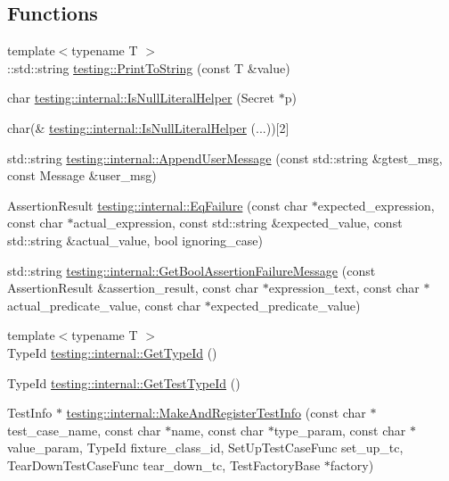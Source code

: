 \subsection*{Functions}
\begin{DoxyCompactItemize}
\item 
{\footnotesize template$<$typename T $>$ }\\\-::std\-::string \hyperlink{namespacetesting_aa5717bb1144edd1d262d310ba70c82ed}{testing\-::\-Print\-To\-String} (const T \&value)
\item 
char \hyperlink{namespacetesting_1_1internal_afb0731ba39ffef1fa1730ac0699c9025}{testing\-::internal\-::\-Is\-Null\-Literal\-Helper} (Secret $\ast$p)
\item 
char(\& \hyperlink{namespacetesting_1_1internal_ab53ecfa1632a871ce7c692d722a75a57}{testing\-::internal\-::\-Is\-Null\-Literal\-Helper} (...))\mbox{[}2\mbox{]}
\item 
std\-::string \hyperlink{namespacetesting_1_1internal_ae475a090bca903bb222dd389eb189166}{testing\-::internal\-::\-Append\-User\-Message} (const std\-::string \&gtest\-\_\-msg, const Message \&user\-\_\-msg)
\item 
Assertion\-Result \hyperlink{namespacetesting_1_1internal_a08725846ff184d3e79bcf5be4df19157}{testing\-::internal\-::\-Eq\-Failure} (const char $\ast$expected\-\_\-expression, const char $\ast$actual\-\_\-expression, const std\-::string \&expected\-\_\-value, const std\-::string \&actual\-\_\-value, bool ignoring\-\_\-case)
\item 
std\-::string \hyperlink{namespacetesting_1_1internal_a5fd6e5dc9eb20ab3c3a80e24d89dfac6}{testing\-::internal\-::\-Get\-Bool\-Assertion\-Failure\-Message} (const Assertion\-Result \&assertion\-\_\-result, const char $\ast$expression\-\_\-text, const char $\ast$actual\-\_\-predicate\-\_\-value, const char $\ast$expected\-\_\-predicate\-\_\-value)
\item 
{\footnotesize template$<$typename T $>$ }\\Type\-Id \hyperlink{namespacetesting_1_1internal_a6b108e56fdc68ea937ffb3759fb55ab0}{testing\-::internal\-::\-Get\-Type\-Id} ()
\item 
Type\-Id \hyperlink{namespacetesting_1_1internal_ad0d66d56ead224263cd100c1d6bfc562}{testing\-::internal\-::\-Get\-Test\-Type\-Id} ()
\item 
Test\-Info $\ast$ \hyperlink{namespacetesting_1_1internal_a8280dfb4f7c8d5b71184f91f4725f759}{testing\-::internal\-::\-Make\-And\-Register\-Test\-Info} (const char $\ast$test\-\_\-case\-\_\-name, const char $\ast$name, const char $\ast$type\-\_\-param, const char $\ast$value\-\_\-param, Type\-Id fixture\-\_\-class\-\_\-id, Set\-Up\-Test\-Case\-Func set\-\_\-up\-\_\-tc, Tear\-Down\-Test\-Case\-Func tear\-\_\-down\-\_\-tc, Test\-Factory\-Base $\ast$factory)

\end{DoxyCompactItemize}
